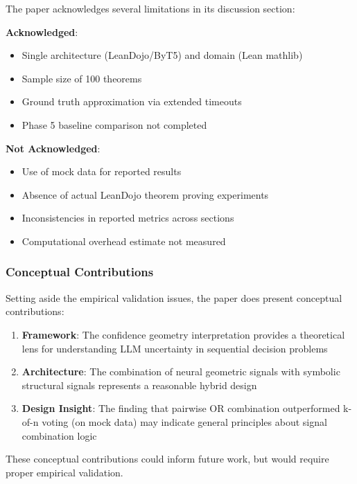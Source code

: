 The paper acknowledges several limitations in its discussion section:

\textbf{Acknowledged}:
\begin{itemize}
\item Single architecture (LeanDojo/ByT5) and domain (Lean mathlib)
\item Sample size of 100 theorems
\item Ground truth approximation via extended timeouts
\item Phase 5 baseline comparison not completed
\end{itemize}

\textbf{Not Acknowledged}:
\begin{itemize}
\item Use of mock data for reported results
\item Absence of actual LeanDojo theorem proving experiments
\item Inconsistencies in reported metrics across sections
\item Computational overhead estimate not measured
\end{itemize}

\subsubsection{Conceptual Contributions}

Setting aside the empirical validation issues, the paper does present conceptual contributions:

\begin{enumerate}
\item \textbf{Framework}: The confidence geometry interpretation provides a theoretical lens for understanding LLM uncertainty in sequential decision problems
\item \textbf{Architecture}: The combination of neural geometric signals with symbolic structural signals represents a reasonable hybrid design
\item \textbf{Design Insight}: The finding that pairwise OR combination outperformed k-of-n voting (on mock data) may indicate general principles about signal combination logic
\end{enumerate}

These conceptual contributions could inform future work, but would require proper empirical validation.
